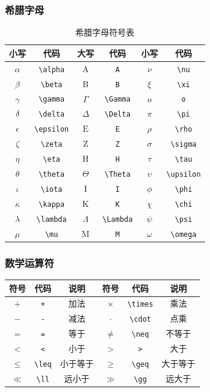 \documentclass{article}
\begin{document}
\subsubsection{希腊字母}
\begin{table}[H]
\centering
\begin{tabular}{|c|c|c|c|c|c|}
\hline
小写 & 代码 & 大写 & 代码 & 小写 & 代码 \\
\hline
$\alpha$ & \verb|\alpha| & $\mathrm{A}$ & \verb|A| & $\nu$ & \verb|\nu| \\
$\beta$ & \verb|\beta| & $\mathrm{B}$ & \verb|B| & $\xi$ & \verb|\xi| \\
$\gamma$ & \verb|\gamma| & $\Gamma$ & \verb|\Gamma| & $o$ & \verb|o| \\
$\delta$ & \verb|\delta| & $\Delta$ & \verb|\Delta| & $\pi$ & \verb|\pi| \\
$\epsilon$ & \verb|\epsilon| & $\mathrm{E}$ & \verb|E| & $\rho$ & \verb|\rho| \\
$\zeta$ & \verb|\zeta| & $\mathrm{Z}$ & \verb|Z| & $\sigma$ & \verb|\sigma| \\
$\eta$ & \verb|\eta| & $\mathrm{H}$ & \verb|H| & $\tau$ & \verb|\tau| \\
$\theta$ & \verb|\theta| & $\Theta$ & \verb|\Theta| & $\upsilon$ & \verb|\upsilon| \\
$\iota$ & \verb|\iota| & $\mathrm{I}$ & \verb|I| & $\phi$ & \verb|\phi| \\
$\kappa$ & \verb|\kappa| & $\mathrm{K}$ & \verb|K| & $\chi$ & \verb|\chi| \\
$\lambda$ & \verb|\lambda| & $\Lambda$ & \verb|\Lambda| & $\psi$ & \verb|\psi| \\
$\mu$ & \verb|\mu| & $\mathrm{M}$ & \verb|M| & $\omega$ & \verb|\omega| \\
\hline
\end{tabular}
\caption{希腊字母符号表}
\end{table}

\subsubsection{数学运算符}
\begin{center}
\begin{tabular}{ccc|ccc}
\hline
\textbf{符号} & \textbf{代码} & \textbf{说明} & \textbf{符号} & \textbf{代码} & \textbf{说明} \\
\hline
$+$ & \verb|+| & 加法 & $\times$ & \verb|\times| & 乘法 \\
$-$ & \verb|-| & 减法 & $\cdot$ & \verb|\cdot| & 点乘 \\
$=$ & \verb|=| & 等于 & $\neq$ & \verb|\neq| & 不等于 \\
$<$ & \verb|<| & 小于 & $>$ & \verb|>| & 大于 \\
$\leq$ & \verb|\leq| & 小于等于 & $\geq$ & \verb|\geq| & 大于等于 \\
$\ll$ & \verb|\ll| & 远小于 & $\gg$ & \verb|\gg| & 远大于 \\
\hline
\end{tabular}
\end{center}
\end{document}
